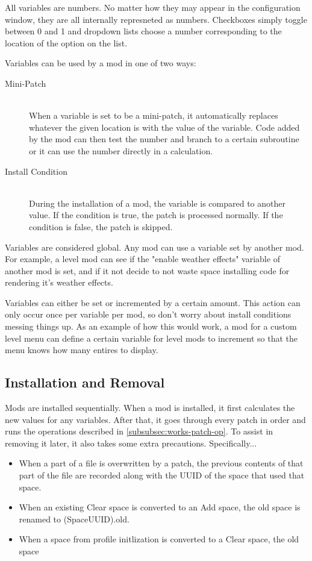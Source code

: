 \documentclass[12pt,a4paper,notitlepage]{article}
\begin{document}
All variables are numbers. No matter how they may appear in the configuration window, they are all internally represneted as numbers. Checkboxes simply toggle between 0 and 1 and dropdown lists choose a number corresponding to the location of the option on the list.

Variables can be used by a mod in one of two ways:

\begin{description}
\item[Mini-Patch] \hfill \\ 
	When a variable is set to be a mini-patch, it automatically replaces whatever the given location is with the value of the variable. Code added by the mod can then test the number and branch to a certain subroutine or it can use the number directly in a calculation.
\item[Install Condition] \hfill \\
	During the installation of a mod, the variable is compared to another value. If the condition is true, the patch is processed normally. If the condition is false, the patch is skipped.
\end{description}

Variables are considered global. Any mod can use a variable set by another mod. For example, a level mod can see if the "enable weather effects" variable of another mod is set, and if it not decide to not waste space installing code for rendering it's weather effects.

Variables can either be set or incremented by a certain amount. This action can only occur once per variable per mod, so don't worry about install conditions messing things up. As an example of how this would work, a mod for a custom level menu can define a certain variable for level mods to increment so that the menu knows how many entires to display.

\subsection{Installation and Removal}
Mods are installed sequentially. When a mod is installed, it first calculates the new values for any variables. After that, it goes through every patch in order and runs the operations described in \ref{subsubsec:works-patch-op}. To assist in removing it later, it also takes some extra precautions. Specifically...

\begin{itemize}
	\item When a part of a file is overwritten by a patch, the previous contents of that part of the file are recorded along with the UUID of the space that used that space.
	\item When an existing Clear space is converted to an Add space, the old space is renamed to (SpaceUUID).old.
	\item When a space from profile initlization is converted to a Clear space, the old space
\end{itemize}
\end{document}
